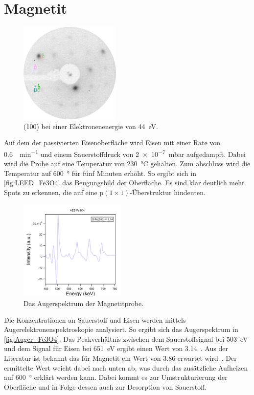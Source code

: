     \section{Magnetit}
        \begin{figure}
            \centering
            \includegraphics[height=5cm]{./content/pictures/Fe3O4/2021_09_07_012_FeO(100)_44eV.png}
            \caption{ (100) bei einer Elektronenenergie von \SI{44}{\electronvolt}.}
            \label{fig:LEED_Fe3O4}
        \end{figure}
        Auf dem der passivierten Eisenoberfläche wird Eisen mit einer Rate von \SI{0.6}{\ML\per\minute} und einem Sauerstoffdruck von \SI{2e-7}{\milli\bar} aufgedampft.
        Dabei wird die Probe auf eine Temperatur von \SI{230}{\celsius} gehalten.
        Zum abschluss wird die Temperatur auf \SI{600}{\degree} für fünf Minuten erhöht.
        So ergibt sich in \autoref{fig:LEED_Fe3O4} das Beugungsbild der Oberfläche.
        Es sind klar deutlich mehr Spots zu erkennen, die auf eine $\text{p}(1 \times 1)$-Überstruktur hindeuten.

        \begin{figure}
            \centering
            \includegraphics[height=5cm]{./content/pictures/Fe3O4/AES_Fe3O4.png}
            \caption{Das Augerspektrum der Magnetitprobe.}
            \label{fig:Auger_Fe3O4}
        \end{figure}
        Die Konzentrationen an Sauerstoff und Eisen werden mittels Augerelektronenspektroskopie analysiert.
        So ergibt sich das Augerspektrum in \autoref{fig:Auger_Fe3O4}.
        Das Peakverhältnis zwischen dem Sauerstoffsignal bei \SI{503}{\electronvolt} und dem Signal für Eisen bei \SI{651}{\electronvolt} ergibt einen Wert von \num{3.14}~\cite{FeO_1, Auger}.
        Aus der Literatur ist bekannt das für Magnetit ein Wert von \num{3.86} erwartet wird~\cite{FeO_1}.
        Der ermittelte Wert weicht dabei nach unten ab, was durch das zusätzliche Aufheizen auf \SI{600}{\degree} erklärt werden kann.
        Dabei kommt es zur Umstrukturierung der Oberfläche und in Folge dessen auch zur Desorption von Sauerstoff.

